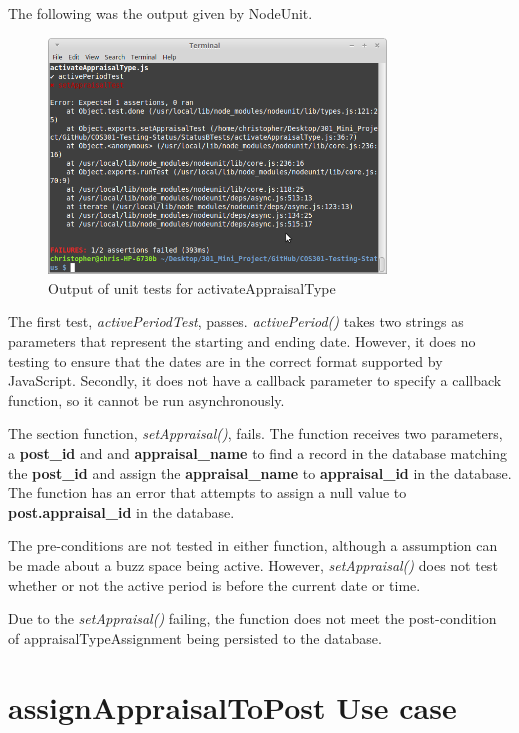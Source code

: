 \documentclass[a4paper,12pt]{article}
\begin{document}
The following was the output given by NodeUnit.

	\begin{figure}[H]
		\centering
		\includegraphics[width=0.8\textwidth]{Figures/activateAppraisalTypeUnitTestOutput.png}
		\caption{Output of unit tests for activateAppraisalType}
	\end{figure}

The first test, \textit{activePeriodTest}, passes. \textit{activePeriod()} takes two strings as parameters that represent the starting and ending date. However, it does no testing to ensure that the dates are in the correct format supported by JavaScript. Secondly, it does not have a callback parameter to specify a callback function, so it cannot be run asynchronously.

The section function, \textit{setAppraisal()}, fails. The function receives two parameters, a \textbf{post\_id} and and \textbf{appraisal\_name} to find a record in the database matching the \textbf{post\_id} and assign the \textbf{appraisal\_name} to \textbf{appraisal\_id} in the database. The function has an error that attempts to assign a null value to \textbf{post.appraisal\_id} in the database. 

The pre-conditions are not tested in either function, although a assumption can be made about a buzz space being active. However, \textit{setAppraisal()} does not test whether or not the active period is before the current date or time.

Due to the \textit{setAppraisal()} failing, the function does not meet the post-condition of appraisalTypeAssignment being persisted to the database.

\newpage
\section{assignAppraisalToPost Use case}
\end{document}
